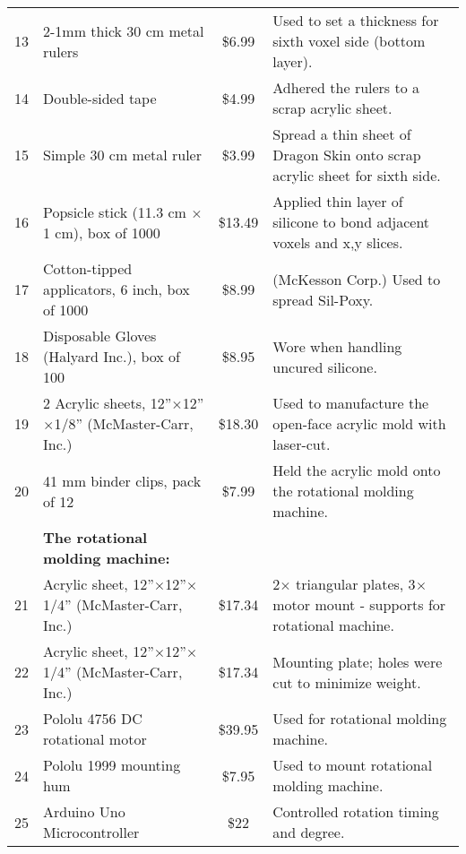 \begin{table*}
\begin{scriptsize}
\begin{center}
\begin{tabular}{clcl}
 13 & 2-1mm thick 30 cm metal rulers & \$6.99 & Used to set a thickness for sixth voxel side (bottom layer). \\ 
 \rowcolor{gray!25}
 14 & Double-sided tape & \$4.99 & Adhered the rulers to a scrap acrylic sheet. \\ 
 15 & Simple 30 cm metal ruler & \$3.99 & Spread a thin sheet of Dragon Skin onto scrap acrylic sheet for sixth side. \\ 
 \rowcolor{gray!25}
 16 & Popsicle stick (11.3 cm $\times$ 1 cm), box of 1000 & \$13.49 & Applied thin layer of silicone to bond adjacent voxels and x,y slices. \\ 
  17 & Cotton-tipped applicators, 6 inch, box of 1000 & \$8.99 & (McKesson Corp.) Used to spread Sil-Poxy. \\
  \rowcolor{gray!25}
 18 & Disposable Gloves (Halyard Inc.), box of 100 & \$8.95 & Wore when handling uncured silicone. \\ 
 19 & 2 Acrylic sheets, 12''$\times$12''$\times$1/8'' (McMaster-Carr, Inc.) & \$18.30 & Used to manufacture the open-face acrylic mold with laser-cut. \\ 
 \rowcolor{gray!25}
 20 & 41 mm binder clips, pack of 12 & \$7.99 & Held the acrylic mold onto the rotational molding machine. \\
 \toprule
  & \textbf{The rotational molding machine:} & & \\
 \toprule
 \rowcolor{gray!25}
 21 & Acrylic sheet, 12''$\times$12''$\times$1/4'' (McMaster-Carr, Inc.) & \$17.34 &  2$\times$ triangular plates, 3$\times$ motor mount - supports for rotational machine. \\ 
 22 & Acrylic sheet, 12''$\times$12''$\times$1/4'' (McMaster-Carr, Inc.) & \$17.34 & Mounting plate; holes were cut to minimize weight. \\ 
 \rowcolor{gray!25}
 23 & Pololu 4756 DC rotational motor & \$39.95 & Used for rotational molding machine. \\ 
 24 & Pololu 1999 mounting hum  & \$7.95 & Used to mount rotational molding machine. \\ 
 \rowcolor{gray!25}
 25 & Arduino Uno Microcontroller & \$22 & Controlled rotation timing and degree. \\ %

\end{tabular}
\end{center}
\end{scriptsize}
\end{table*}
